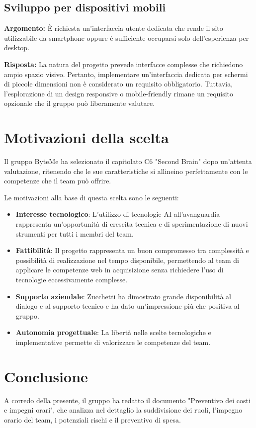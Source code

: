 \documentclass[11pt,a4paper]{article}
\begin{document}
\subsection{Sviluppo per dispositivi mobili}
\textbf{Argomento:} È richiesta un'interfaccia utente dedicata che rende il sito utilizzabile da smartphone oppure è sufficiente occuparsi solo dell'esperienza per desktop.

\textbf{Risposta:} La natura del progetto prevede interfacce complesse che richiedono ampio spazio visivo. Pertanto, implementare un'interfaccia dedicata per schermi di piccole dimensioni non è considerato un requisito obbligatorio. Tuttavia, l'esplorazione di un design responsive o mobile-friendly rimane un requisito opzionale che il gruppo può liberamente valutare.

\newpage
\section{Motivazioni della scelta}
Il gruppo ByteMe ha selezionato il capitolato C6 "Second Brain" dopo un'attenta valutazione, ritenendo che le sue caratteristiche si allineino perfettamente con le competenze che il team può offrire.

Le motivazioni alla base di questa scelta sono le seguenti:
\begin{itemize}
    \item \textbf{Interesse tecnologico}: L'utilizzo di tecnologie AI all'avanguardia rappresenta un'opportunità di crescita tecnica e di sperimentazione di nuovi strumenti per tutti i membri del team.
    \item \textbf{Fattibilità}: Il progetto rappresenta un buon compromesso tra complessità e possibilità di realizzazione nel tempo disponibile, permettendo al team di applicare le competenze web in acquisizione senza richiedere l'uso di tecnologie eccessivamente complesse.
    \item \textbf{Supporto aziendale}: Zucchetti ha dimostrato grande disponibilità al dialogo e al supporto tecnico e ha dato un'impressione più che positiva al gruppo.
    \item \textbf{Autonomia progettuale}: La libertà nelle scelte tecnologiche e implementative permette di valorizzare le competenze del team.
\end{itemize}

\newpage
\section{Conclusione}
A corredo della presente, il gruppo ha redatto il documento "Preventivo dei costi e impegni orari", che analizza nel dettaglio la suddivisione dei ruoli, l'impegno orario del team, i potenziali rischi e il preventivo di spesa.
\end{document}
